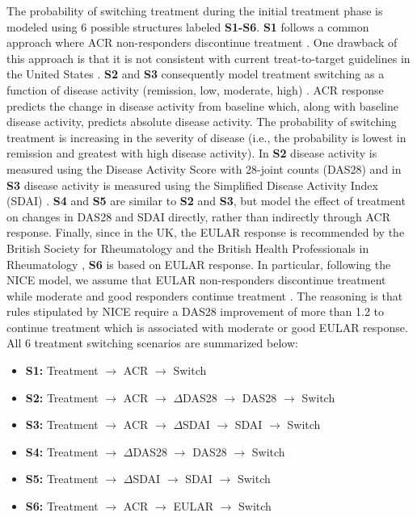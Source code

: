 \documentclass[11pt,final,fleqn]{article}\usepackage[]{graphicx}\usepackage[]{color}
\theoremstyle{plain}
\begin{document}
The probability of switching treatment during the initial treatment phase is modeled using 6 possible structures labeled \textbf{S1-S6}. \textbf{S1} follows a common approach where ACR non-responders discontinue treatment \citep[e.g.][]{carlson2015economic, icer2017tim}. One drawback of this approach is that it is not consistent with current treat-to-target guidelines in the United States \citep{singh20162015}. \textbf{S2} and \textbf{S3} consequently model treatment switching as a function of disease activity (remission, low, moderate, high) \citep{anderson2012rheumatoid}. ACR response predicts the change in disease activity from baseline which, along with baseline disease activity, predicts absolute disease activity. The probability of switching treatment is increasing in the severity of disease (i.e., the probability is lowest in remission and greatest with high disease activity). In \textbf{S2} disease activity is measured using the Disease Activity Score with 28-joint counts (DAS28) \citep{prevoo1995modified} and in \textbf{S3} disease activity is measured using the Simplified Disease Activity Index (SDAI) \citep{smolen2003simplified, aletaha2005simplified}. \textbf{S4} and \textbf{S5} are similar to \textbf{S2} and \textbf{S3}, but model the effect of treatment on changes in DAS28 and SDAI directly, rather than indirectly through ACR response. Finally, since in the UK, the EULAR response is recommended by the British Society for Rheumatology and the British Health Professionals in Rheumatology \citep{deighton2010bsr}, \textbf{S6} is based on EULAR response. In particular, following the NICE model, we assume that EULAR non-responders discontinue treatment while moderate and good responders continue treatment \citep{stevenson2016adalimumab}. The reasoning is that rules stipulated by NICE require a DAS28 improvement of more than 1.2 to continue treatment which is associated with moderate or good EULAR response. All 6 treatment switching scenarios are summarized below: 

\begin{itemize}
\item \textbf{S1:} Treatment $\rightarrow$ ACR $\rightarrow$ Switch
\item \textbf{S2:} Treatment $\rightarrow$ ACR $\rightarrow$ $\Delta$DAS28 $\rightarrow$ DAS28 $\rightarrow$ Switch 
\item \textbf{S3:} Treatment $\rightarrow$ ACR $\rightarrow$ $\Delta$SDAI $\rightarrow$ SDAI $\rightarrow$ Switch 
\item \textbf{S4:} Treatment $\rightarrow$ $\Delta$DAS28 $\rightarrow$ DAS28 $\rightarrow$ Switch 
\item \textbf{S5:} Treatment  $\rightarrow$ $\Delta$SDAI $\rightarrow$ SDAI $\rightarrow$ Switch 
\item \textbf{S6:} Treatment $\rightarrow$ ACR $\rightarrow$ EULAR $\rightarrow$ Switch
\end{itemize}
\end{document}
